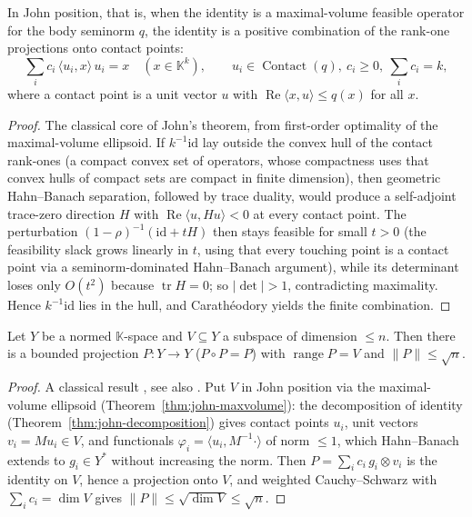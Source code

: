 \begin{theorem}
\label{thm:john-decomposition}
\leanok
In John position, that is, when the identity is a maximal-volume feasible operator
for the body seminorm $q$, the identity is a positive combination of the rank-one
projections onto contact points:
\[
  \sum_i c_i \, \langle u_i, x\rangle \, u_i = x \quad (x \in \mathbb{K}^k),
  \qquad u_i \in \operatorname{Contact}(q),\ c_i \ge 0,\ \sum_i c_i = k,
\]
where a contact point is a unit vector $u$ with $\operatorname{Re}\langle x, u\rangle
\le q(x)$ for all $x$.
\end{theorem}
\begin{proof}
\leanok
The classical core of John's theorem, from first-order optimality of the
maximal-volume ellipsoid. If $k^{-1}\mathrm{id}$ lay outside the convex hull of the
contact rank-ones (a compact convex set of operators, whose compactness uses
that convex hulls of compact sets are compact in finite dimension), then
geometric Hahn--Banach separation, followed by trace duality, would produce a
self-adjoint trace-zero direction $H$ with $\operatorname{Re}\langle u, Hu\rangle
< 0$ at every contact point. The perturbation $(1-\rho)^{-1}(\mathrm{id} + tH)$
then stays feasible for small $t>0$ (the feasibility slack grows linearly in $t$,
using that every touching point is a contact point via a seminorm-dominated
Hahn--Banach argument), while its determinant loses only $O(t^2)$ because
$\operatorname{tr} H = 0$; so $|\det| > 1$, contradicting maximality. Hence
$k^{-1}\mathrm{id}$ lies in the hull, and Carathéodory yields the finite
combination.
\end{proof}

\begin{theorem}
\label{thm:kadets-snobar}
\leanok
Let $Y$ be a normed $\mathbb{K}$-space and $V \subseteq Y$ a subspace of dimension
$\le n$. Then there is a bounded projection $P : Y \to Y$ ($P \circ P = P$) with
$\operatorname{range} P = V$ and $\|P\| \le \sqrt{n}$.
\end{theorem}
\begin{proof}
\leanok
{}
A classical result \cite{KS71}, see also \cite[1.5.5]{Pietsch87}. Put $V$ in
John position via the maximal-volume ellipsoid
(Theorem~\ref{thm:john-maxvolume}): the decomposition of identity
(Theorem~\ref{thm:john-decomposition}) gives contact points $u_i$, unit vectors
$v_i = M u_i \in V$, and functionals $\varphi_i = \langle u_i, M^{-1}\cdot\rangle$
of norm $\le 1$, which Hahn--Banach extends to $g_i \in Y^*$ without increasing
the norm. Then $P = \sum_i c_i\, g_i \otimes v_i$ is the identity on $V$, hence a
projection onto $V$, and weighted Cauchy--Schwarz with $\sum_i c_i = \dim V$ gives
$\|P\| \le \sqrt{\dim V} \le \sqrt{n}$.
\end{proof}

